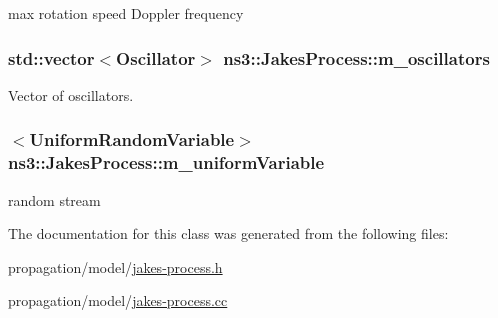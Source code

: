 max rotation speed Doppler frequency 

\subsubsection[{\texorpdfstring{m\+\_\+oscillators}{m_oscillators}}]{\setlength{\rightskip}{0pt plus 5cm}std\+::vector$<${\bf Oscillator}$>$ ns3\+::\+Jakes\+Process\+::m\+\_\+oscillators\hspace{0.3cm}{\ttfamily [private]}}\hypertarget{classns3_1_1JakesProcess_a755674c3009ba93c4a1c0ca064911e75}{}\label{classns3_1_1JakesProcess_a755674c3009ba93c4a1c0ca064911e75}


Vector of oscillators. 

\subsubsection[{\texorpdfstring{m\+\_\+uniform\+Variable}{m_uniformVariable}}]{$<${\bf Uniform\+Random\+Variable}$>$ ns3\+::\+Jakes\+Process\+::m\+\_\+uniform\+Variable\hspace{0.3cm}{\ttfamily [private]}}\hypertarget{classns3_1_1JakesProcess_a2bada1f27e9f1b924b5b0b5da0363f5d}{}\label{classns3_1_1JakesProcess_a2bada1f27e9f1b924b5b0b5da0363f5d}


random stream 



The documentation for this class was generated from the following files\+:\begin{DoxyCompactItemize}
\item 
propagation/model/\hyperlink{jakes-process_8h}{jakes-\/process.\+h}\item 
propagation/model/\hyperlink{jakes-process_8cc}{jakes-\/process.\+cc}\end{DoxyCompactItemize}
